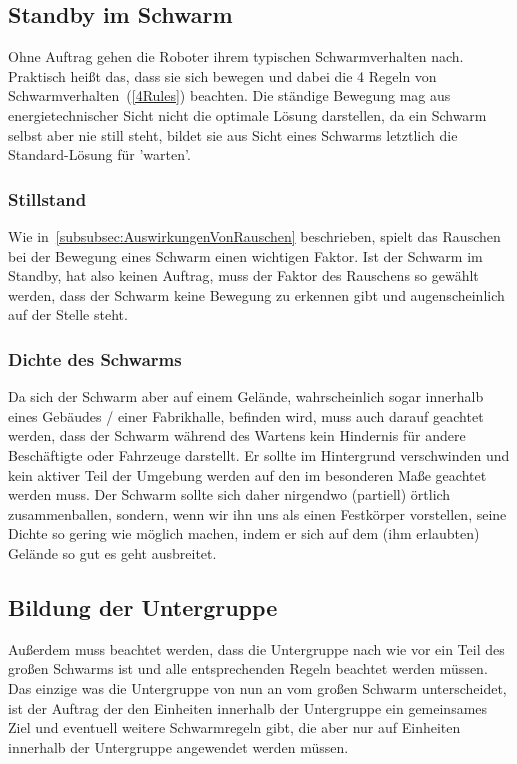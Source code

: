 \subsection*{Standby im Schwarm}\label{subsec:StandbyImSchwarm}
Ohne Auftrag gehen die Roboter ihrem typischen Schwarmverhalten nach. Praktisch heißt das, dass sie sich bewegen und dabei die 4 Regeln von Schwarmverhalten~(\autoref{4Rules}) beachten.
Die ständige Bewegung mag aus energietechnischer Sicht nicht die optimale Lösung darstellen, da ein Schwarm selbst aber nie still steht, bildet sie aus Sicht eines Schwarms letztlich die Standard-Lösung für 'warten'.

\subsubsection*{Stillstand}\label{subsubsec:Stillstand}
Wie in~\autoref{subsubsec:AuswirkungenVonRauschen} beschrieben, spielt das Rauschen bei der Bewegung eines Schwarm einen wichtigen Faktor.
Ist der Schwarm im Standby, hat also keinen Auftrag, muss der Faktor des Rauschens so gewählt werden, dass der Schwarm keine Bewegung zu erkennen gibt und augenscheinlich auf der Stelle steht.

\subsubsection*{Dichte des Schwarms}\label{subsubsec:DichteDesSchwarms}
Da sich der Schwarm aber auf einem Gelände, wahrscheinlich sogar innerhalb eines Gebäudes / einer Fabrikhalle, befinden wird, muss auch darauf geachtet werden, dass der Schwarm während des Wartens kein Hindernis für andere Beschäftigte oder Fahrzeuge darstellt.
Er sollte im Hintergrund verschwinden und kein aktiver Teil der Umgebung werden auf den im besonderen Maße geachtet werden muss.
Der Schwarm sollte sich daher nirgendwo (partiell) örtlich zusammenballen, sondern, wenn wir ihn uns als einen Festkörper vorstellen, seine Dichte so gering wie möglich machen, indem er sich auf dem (ihm erlaubten) Gelände so gut es geht ausbreitet.

\subsection*{Bildung der Untergruppe}
Außerdem muss beachtet werden, dass die Untergruppe nach wie vor ein Teil des großen Schwarms ist und alle entsprechenden Regeln beachtet werden müssen.
Das einzige was die Untergruppe von nun an vom großen Schwarm unterscheidet, ist der Auftrag der den Einheiten innerhalb der Untergruppe ein gemeinsames Ziel und eventuell weitere Schwarmregeln gibt, die aber nur auf Einheiten innerhalb der Untergruppe angewendet werden müssen.

